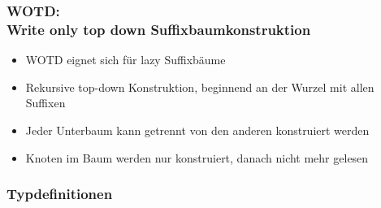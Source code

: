 \documentclass{beamer}
\begin{document}
\begin{frame}
\frametitle{WOTD: \\ Write only top down Suffixbaumkonstruktion}
\begin{itemize}
    \item WOTD eignet sich für lazy Suffixbäume
    \item Rekursive top-down Konstruktion, beginnend an der Wurzel mit allen Suffixen
    \item Jeder Unterbaum kann getrennt von den anderen konstruiert werden
    \item Knoten im Baum werden nur konstruiert, danach nicht mehr gelesen
\end{itemize}
\end{frame}

\subsubsection{Typdefinitionen}
\end{document}
